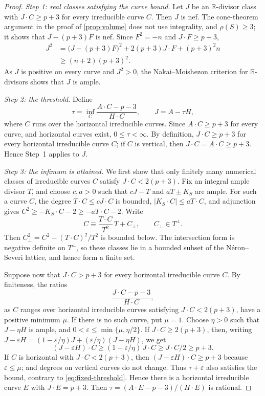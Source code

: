 \documentclass[11pt,reqno]{amsart}
\numberwithin{equation}{section}
\theoremstyle{remark}
\begin{document}
\begin{proof}
\emph{Step 1: real classes satisfying the curve bound.} Let \(J\) be an \(\mathbb R\)-divisor class with \(J\cdot C\geq p+3\) for every irreducible curve \(C\). Then \(J\) is nef. The cone-theorem argument in the proof of \cref{prop:volume} does not use integrality, and \(\rho(S)\geq3\); it shows that \(J-(p+3)F\) is nef. Since \(F^2=-n\) and \(J\cdot F\geq p+3\),
\begin{align*}
 J^2&=\bigl(J-(p+3)F\bigr)^2+2(p+3)J\cdot F+(p+3)^2n\\
 &\geq(n+2)(p+3)^2.
\end{align*}
As \(J\) is positive on every curve and \(J^2>0\), the Nakai--Moishezon criterion for \(\mathbb R\)-divisors \cite[Theorem~1.4]{FujinoMiyamoto} shows that \(J\) is ample.

\smallskip\noindent\emph{Step 2: the threshold.} Define
\begin{equation}\label{eq:fixed-threshold}
 \tau=\inf_C\frac{A\cdot C-p-3}{H\cdot C},\qquad J=A-\tau H,
\end{equation}
where \(C\) runs over the horizontal irreducible curves. Since \(A\cdot C\geq p+3\) for every curve, and horizontal curves exist, \(0\leq\tau<\infty\). By definition, \(J\cdot C\geq p+3\) for every horizontal irreducible curve \(C\); if \(C\) is vertical, then \(J\cdot C=A\cdot C\geq p+3\). Hence Step~1 applies to \(J\).

\smallskip\noindent\emph{Step 3: the infimum is attained.} We first show that only finitely many numerical classes of irreducible curves \(C\) satisfy \(J\cdot C<2(p+3)\). Fix an integral ample divisor \(T\), and choose \(c,a>0\) such that \(cJ-T\) and \(aT\pm K_S\) are ample. For such a curve \(C\), the degree \(T\cdot C\leq cJ\cdot C\) is bounded, \(|K_S\cdot C|\leq aT\cdot C\), and adjunction gives \(C^2\geq-K_S\cdot C-2\geq-aT\cdot C-2\). Write
\[
 C\equiv\frac{T\cdot C}{T^2}\,T+C_\perp,\qquad C_\perp\in T^\perp.
\]
Then \(C_\perp^2=C^2-(T\cdot C)^2/T^2\) is bounded below. The intersection form is negative definite on \(T^\perp\), so these classes lie in a bounded subset of the N\'eron--Severi lattice, and hence form a finite set.

Suppose now that \(J\cdot C>p+3\) for every horizontal irreducible curve \(C\). By finiteness, the ratios 
\[\frac{J\cdot C-p-3}{H\cdot C},\] as \(C\) ranges over horizontal irreducible curves satisfying \(J\cdot C<2(p+3)\), have a positive minimum \(\mu\). If there is no such curve, put \(\mu=1\). Choose \(\eta>0\) such that \(J-\eta H\) is ample, and \(0<\varepsilon\leq\min\{\mu,\eta/2\}\). If \(J\cdot C\geq2(p+3)\), then, writing \(J-\varepsilon H=(1-\varepsilon/\eta)J+(\varepsilon/\eta)(J-\eta H)\), we get
\[
 (J-\varepsilon H)\cdot C\geq(1-\varepsilon/\eta)\,J\cdot C\geq J\cdot C/2\geq p+3.
\]
If \(C\) is horizontal with \(J\cdot C<2(p+3)\), then \((J-\varepsilon H)\cdot C\geq p+3\) because \(\varepsilon\leq\mu\); and degrees on vertical curves do not change. Thus \(\tau+\varepsilon\) also satisfies the bound, contrary to \eqref{eq:fixed-threshold}. Hence there is a horizontal irreducible curve \(E\) with \(J\cdot E=p+3\). Then \(\tau=(A\cdot E-p-3)/(H\cdot E)\) is rational.


\end{proof}
\end{document}
